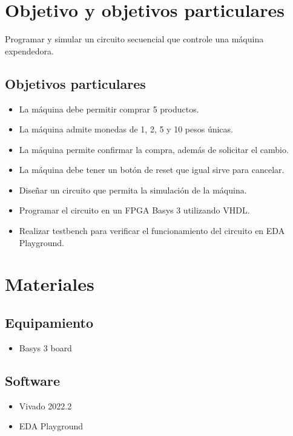 \documentclass[12pt]{article}  %
\begin{document}
\section{Objetivo y objetivos particulares}
Programar y simular un circuito secuencial que controle una máquina expendedora.
\subsection{Objetivos particulares}
\begin{itemize}
  \item La máquina debe permitir comprar 5 productos.
  \item La máquina admite monedas de 1, 2, 5 y 10 pesos únicas.
  \item La máquina permite confirmar la compra, además de solicitar el cambio.
  \item La máquina debe tener un botón de reset que igual sirve para cancelar.
  \item Diseñar un circuito que permita la simulación de la máquina.
  \item Programar el circuito en un FPGA Basys 3 utilizando VHDL.
  \item Realizar testbench para verificar el funcionamiento del circuito en EDA Playground.
\end{itemize}

\section*{Materiales}

\subsection*{Equipamiento}

\begin{itemize}
  \item Basys 3 board
\end{itemize}

\subsection*{Software}

\begin{itemize}
  \item Vivado 2022.2
  \item EDA Playground
\end{itemize}
\end{document}
